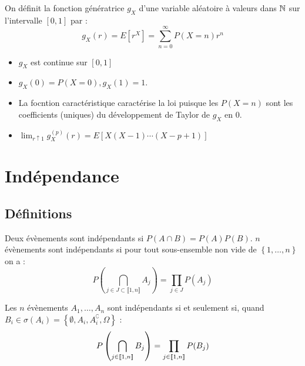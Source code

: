 \documentclass{cours}
\begin{document}
    \begin{definition}
        On définit la fonction génératrice $g_{X}$ d'une variable aléatoire à valeurs dans $\mathbb{N}$ sur l'intervalle $\left[0, 1\right]$ par : 
        \[
            g_{X}(r) = E[r^{X}] = \sum_{n = 0}^{\infty}P(X = n)r^{n}
        \]
    \end{definition}

    \begin{proposition}
        \begin{itemize}
            \item $g_{X}$ est continue sur $\left[0, 1\right]$
            \item $g_{X}(0) = P(X = 0), g_{X}(1) = 1$.
            \item La focntion caractéristique caractérise la loi puisque les $P(X = n)$ sont les coefficients (uniques) du développement de Taylor de $g_{X}$ en $0$.
            \item $\lim_{r \uparrow 1}g_{X}^{(p)}(r) = E\left[X(X - 1)\cdots(X - p + 1)\right]$
        \end{itemize}
    \end{proposition}

    \section{Indépendance}
        \subsection{Définitions}
            \begin{definition}
                Deux évènements sont indépendants si $P(A\cap B) = P(A)P(B)$. $n$ évènements sont indépendants si pour tout sous-ensemble non vide de $\left\{1, \ldots, n\right\}$ on a :
                \[
                    P\left(\bigcap_{j \in J \subset \llbracket 1, n\rrbracket} A_{j}\right) = \prod_{j \in J} P(A_{j})
                \]
            \end{definition}

            \begin{proposition}
                Les $n$ évènements $A_{1}, \ldots, A_{n}$ sont indépendants si et seulement si, quand $B_{i} \in \sigma\left(A_{i}\right) = \left\{\emptyset, A_{i}, A_{i}^{\complement}, \Omega\right\}$ : 
                \[
                    P\left(\bigcap_{j \in \left\llbracket 1, n\right\rrbracket} B_{j}\right) = \prod_{j \in \left\llbracket 1, n\right\rrbracket} P(B_{j})      
                \]
            \end{proposition}
            
\end{document}
